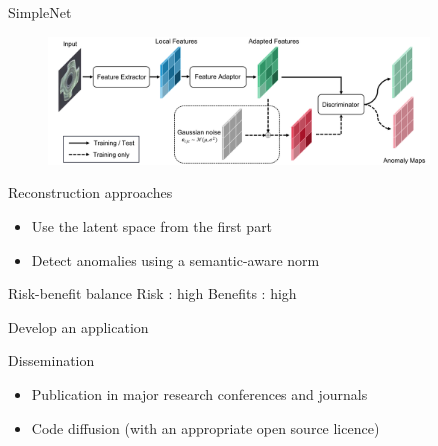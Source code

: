 \documentclass[xcolor=pdftex,dvipsnames,table,mathserif]{beamer}
\begin{document}
\begin{frame}{SimpleNet\tiny{\cite{liu_simplenet_2023}}}

  \begin{figure}[ht]
  \centering
  \includegraphics[width=0.9\textwidth]{simplenet}
\end{figure}

\end{frame}

\begin{frame}{Reconstruction approaches}

\begin{itemize}
\item Use the latent space from the first part
\item Detect anomalies using a semantic-aware norm
\end{itemize}

\begin{block}{Risk-benefit balance}
\hspace{4em} Risk : high \hspace{4em} Benefits : high
\end{block}

\end{frame}


\begin{frame}{Develop an application}


\end{frame}

\begin{frame}{Dissemination}

  \begin{itemize}
  \item Publication in major research conferences and journals
  \item Code diffusion (with an appropriate open source licence)
  \end{itemize}

\end{frame}
\end{document}
